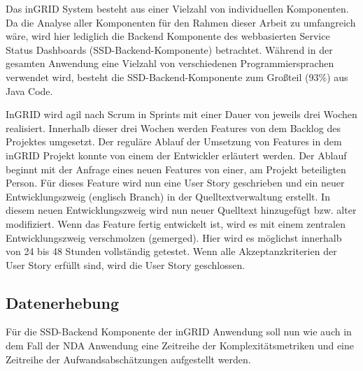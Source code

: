 Das inGRID System besteht aus einer Vielzahl von individuellen
Komponenten. Da die Analyse aller Komponenten für den Rahmen dieser
Arbeit zu umfangreich wäre, wird hier lediglich die Backend Komponente
des webbasierten Service Status Dashboards (SSD-Backend-Komponente)
betrachtet. Während in der gesamten Anwendung eine Vielzahl von
verschiedenen Programmiersprachen verwendet wird, besteht die
SSD-Backend-Komponente zum Großteil (93\%) aus
Java Code.

InGRID wird agil nach Scrum in Sprints mit einer Dauer von jeweils drei
Wochen realisiert. Innerhalb dieser drei Wochen werden Features von dem
Backlog des Projektes umgesetzt. Der reguläre Ablauf der Umsetzung von
Features in dem inGRID Projekt konnte von einem der Entwickler erläutert
werden. Der Ablauf beginnt mit der Anfrage eines neuen Features von
einer, am Projekt beteiligten Person. Für dieses Feature wird nun eine
User Story geschrieben und ein neuer Entwicklungszweig (englisch Branch)
in der Quelltextverwaltung erstellt. In diesem neuen Entwicklungszweig
wird nun neuer Quelltext hinzugefügt bzw. alter modifiziert. Wenn das
Feature fertig entwickelt ist, wird es mit einem zentralen
Entwicklungszweig verschmolzen (gemerged). Hier wird es möglichst
innerhalb von 24 bis 48 Stunden vollständig getestet. Wenn alle
Akzeptanzkriterien der User Story erfüllt sind, wird die User Story
geschlossen.

\subsection{Datenerhebung}\label{ingrid-Datenerhebung}

Für die SSD-Backend Komponente der inGRID Anwendung soll nun wie auch in
dem Fall der NDA Anwendung eine Zeitreihe der Komplexitätsmetriken und
eine Zeitreihe der Aufwandsabschätzungen aufgestellt werden.

